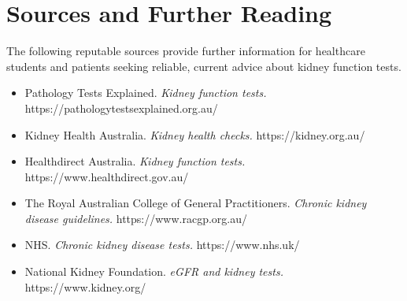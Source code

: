 \section*{Sources and Further Reading}
The following reputable sources provide further information for healthcare students and patients seeking reliable, current advice about kidney function tests.
\begin{itemize}
    \item Pathology Tests Explained. \textit{Kidney function tests.} https://pathologytestsexplained.org.au/
    \item Kidney Health Australia. \textit{Kidney health checks.} https://kidney.org.au/
    \item Healthdirect Australia. \textit{Kidney function tests.} https://www.healthdirect.gov.au/
    \item The Royal Australian College of General Practitioners. \textit{Chronic kidney disease guidelines.} https://www.racgp.org.au/
    \item NHS. \textit{Chronic kidney disease tests.} https://www.nhs.uk/
    \item National Kidney Foundation. \textit{eGFR and kidney tests.} https://www.kidney.org/
\end{itemize}
